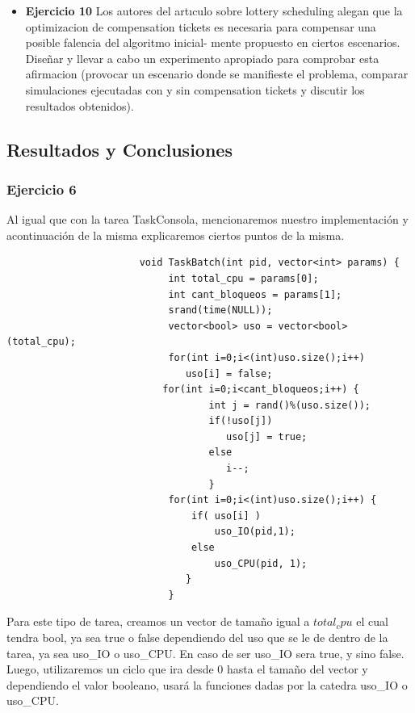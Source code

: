 \begin{itemize}
\item \textbf{Ejercicio 10} Los autores del artıculo sobre lottery scheduling alegan que la optimizacion de
compensation tickets es necesaria para compensar una posible falencia del algoritmo inicial-
mente propuesto en ciertos escenarios. Diseñar y llevar a cabo un experimento apropiado para
comprobar esta afirmacion (provocar un escenario donde se manifieste el problema, comparar
simulaciones ejecutadas con y sin compensation tickets y discutir los resultados obtenidos).

\end{itemize}
\subsection{Resultados y Conclusiones}

\subsubsection[Resolución Ejercicio 6]{Ejercicio 6}

\indent Al igual que con la tarea TaskConsola, mencionaremos nuestro implementación y acontinuación de la misma 
explicaremos ciertos puntos de la misma.\\
 \begin{verbatim}
                       void TaskBatch(int pid, vector<int> params) {
                            int total_cpu = params[0];
                            int cant_bloqueos = params[1];
                            srand(time(NULL));
                            vector<bool> uso = vector<bool>(total_cpu);
                            for(int i=0;i<(int)uso.size();i++) 
                               uso[i] = false;
	                       for(int i=0;i<cant_bloqueos;i++) {
                                   int j = rand()%(uso.size());
                                   if(!uso[j])
                                      uso[j] = true;
                                   else
                                      i--; 
                                   }
                            for(int i=0;i<(int)uso.size();i++) {
                                if( uso[i] )
                                    uso_IO(pid,1); 
                                else
                                    uso_CPU(pid, 1); 
                               }
                            }
 \end{verbatim}

 \indent Para este tipo de tarea, creamos un vector de tamaño igual a $total_cpu$ el cual tendra bool, ya sea true o false
 dependiendo del uso que se le de dentro de la tarea, ya sea uso\_IO o uso\_CPU. En caso de ser uso\_IO sera true, y sino false.\\
 Luego, utilizaremos un ciclo que ira desde 0 hasta el tamaño del vector y dependiendo el valor booleano, usará la funciones
 dadas por la catedra uso\_IO o uso\_CPU.\\
 
